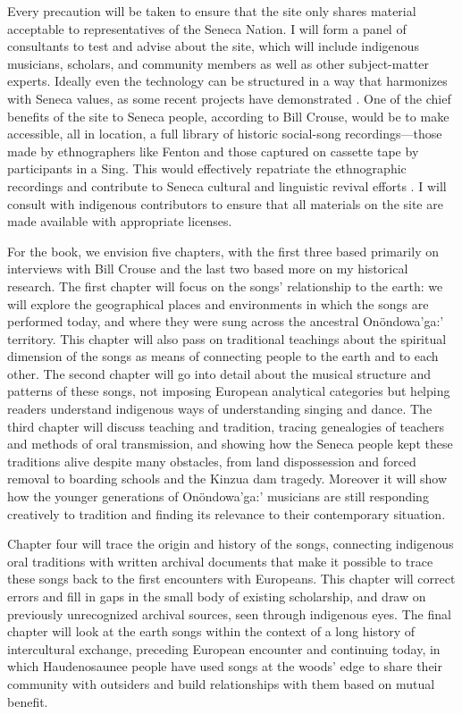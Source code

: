 \documentclass{neh}
\begin{document}
Every precaution will be taken to ensure that the site only shares material
acceptable to representatives of the Seneca Nation.
I will form a panel of consultants to test and advise about the site, which
will include indigenous musicians, scholars, and community members as well as
other subject-matter experts.
Ideally even the technology can be structured in a way that harmonizes with
Seneca values, as some recent projects have demonstrated
\Autocite{Christen:RelationshipsNotRecords}.
One of the chief benefits of the site to Seneca people, according to Bill
Crouse, would be to make accessible, all in location, a full library of
historic social-song recordings---those made by ethnographers like Fenton and
those captured on cassette tape by participants in a Sing.
This would effectively repatriate the ethnographic recordings and contribute
to Seneca cultural and linguistic revival efforts
\Autocite{Fox:Repatriation}.
I will consult with indigenous contributors to ensure that all materials on
the site are made available with appropriate licenses.

For the book, we envision five chapters, with the first three based primarily
on interviews with Bill Crouse and the last two based more on my historical
research.
The first chapter will focus on the songs' relationship to the earth:
we will explore the geographical places and environments in which the songs
are performed today, and where they were sung across the ancestral
Onöndowa’ga:’ territory.
This chapter will also pass on traditional teachings about the spiritual
dimension of the songs as means of connecting people to the earth and to each
other.
The second chapter will go into detail about the musical structure and
patterns of these songs, not imposing European analytical categories but
helping readers understand indigenous ways of understanding singing and dance.
The third chapter will discuss teaching and tradition, tracing genealogies of
teachers and methods of oral transmission, and showing how the Seneca people
kept these traditions alive despite many obstacles, from land dispossession
and forced removal to boarding schools and the Kinzua dam tragedy.
Moreover it will show how the younger generations of Onöndowa'ga:' musicians
are still responding creatively to tradition and finding its relevance to
their contemporary situation.

Chapter four will trace the origin and history of the songs, connecting
indigenous oral traditions with written archival documents that make it
possible to trace these songs back to the first encounters with Europeans.
This chapter will correct errors and fill in gaps in the small body of
existing scholarship, and draw on previously unrecognized archival sources,
seen through indigenous eyes.
The final chapter will look at the earth songs within the context of a long
history of intercultural exchange, preceding European encounter and continuing
today, in which Haudenosaunee people have used songs at the woods' edge to
share their community with outsiders and build relationships with them based
on mutual benefit.
\end{document}
